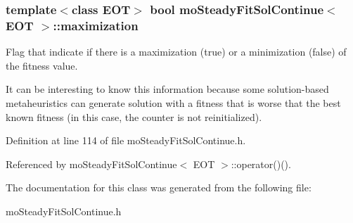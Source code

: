 \subsubsection{\setlength{\rightskip}{0pt plus 5cm}template$<$class EOT$>$ bool {\bf moSteadyFitSolContinue}$<$ EOT $>$::{\bf maximization}\hspace{0.3cm}{\tt  [private]}}\label{classmo_steady_fit_sol_continue_cc54de2c6f32b650e5a7ee36efc1ba73}


Flag that indicate if there is a maximization (true) or a minimization (false) of the fitness value. 

It can be interesting to know this information because some solution-based metaheuristics can generate solution with a fitness that is worse that the best known fitness (in this case, the counter is not reinitialized). 

Definition at line 114 of file moSteadyFitSolContinue.h.

Referenced by moSteadyFitSolContinue$<$ EOT $>$::operator()().

The documentation for this class was generated from the following file:\begin{CompactItemize}
\item 
moSteadyFitSolContinue.h\end{CompactItemize}
